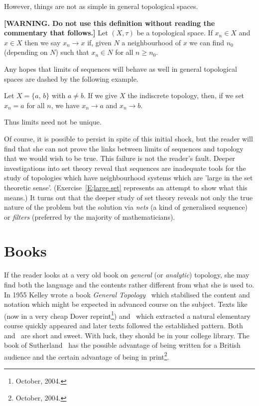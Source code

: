 However, things are not as simple in general topological spaces.
\begin{definition}{\bf [WARNING. Do not use this definition
without reading the commentary that follows.]}%
\label{R;treacherous}
Let $(X,\tau)$ be a topological space. If $x_{n}\in X$
and $x\in X$ then we say $x_{n}\rightarrow x$
if, given $N$ a neighbourhood of $x$ we can find
$n_{0}$ (depending on $N$) such that $x_{n}\in N$
for all $n\geq n_{0}$.
\end{definition}

Any hopes that limits of sequences
will behave as well in general topological spaces
are dashed by the following example.
\begin{example} Let $X=\{a,\,b\}$ with $a\neq b$.
If we give $X$ the indiscrete topology, then,
if we set $x_{n}=a$ for all $n$, we have
$x_{n}\rightarrow a$ and $x_{n}\rightarrow b$.
\end{example}
Thus limits need not be unique.

Of course, it is possible to persist in
spite of this initial shock, but the reader
will find that she can not prove the links
between limits of sequences and topology
that we would wish to be true. This failure
is not the reader's fault. Deeper investigations
into set theory reveal that sequences are
inadequate tools for the study of topologies
which have neighbourhood systems which are 'large
in the set theoretic sense'. (Exercise~\ref{E;large set}
represents an attempt to show what this means.)
It turns out that the deeper study of set theory
reveals not only the true nature of the problem
but the solution via \emph{nets} (a kind of generalised sequence)
or \emph{filters} (preferred by the majority of mathematicians).





\section{Books} If the reader looks at a very old book on \emph{general}
(or \emph{analytic})
topology, she may find both the language and the contents
rather different from what she is used to. In 1955 Kelley
wrote a book \emph{General Topology}~\cite{Kelley} 
which stabilised the content and notation which
might be expected in advanced course on the subject.
Texts like~\cite{Mendeleson} (now in a very 
cheap Dover reprint\footnote{October, 2004.})
and~\cite{Mansfield} 
which extracted a natural elementary
course quickly appeared and later texts followed the
established pattern. Both~\cite{Mendeleson}
and~\cite{Mansfield} are short and sweet.
With luck, they should be in your college library.
The book of Sutherland~\cite{Sutherland}
has the possible advantage of being written for a British audience
and the certain advantage of being in print\footnote{October, 2004.}.

